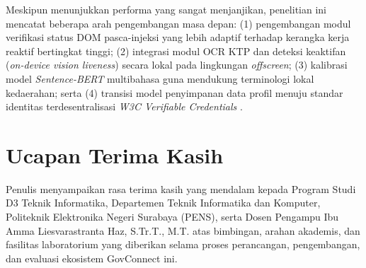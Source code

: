 \documentclass[conference]{IEEEtran}
\begin{document}
Meskipun menunjukkan performa yang sangat menjanjikan, penelitian ini mencatat beberapa arah pengembangan masa depan: (1) pengembangan modul verifikasi status DOM pasca-injeksi yang lebih adaptif terhadap kerangka kerja reaktif bertingkat tinggi; (2) integrasi modul OCR KTP dan deteksi keaktifan (\textit{on-device vision liveness}) secara lokal pada lingkungan \textit{offscreen}; (3) kalibrasi model \textit{Sentence-BERT} multibahasa guna mendukung terminologi lokal kedaerahan; serta (4) transisi model penyimpanan data profil menuju standar identitas terdesentralisasi \textit{W3C Verifiable Credentials} \cite{vc}.

\section*{Ucapan Terima Kasih}
Penulis menyampaikan rasa terima kasih yang mendalam kepada Program Studi D3 Teknik Informatika, Departemen Teknik Informatika dan Komputer, Politeknik Elektronika Negeri Surabaya (PENS), serta Dosen Pengampu Ibu Amma Liesvarastranta Haz, S.Tr.T., M.T. atas bimbingan, arahan akademis, dan fasilitas laboratorium yang diberikan selama proses perancangan, pengembangan, dan evaluasi ekosistem GovConnect ini.
\end{document}
